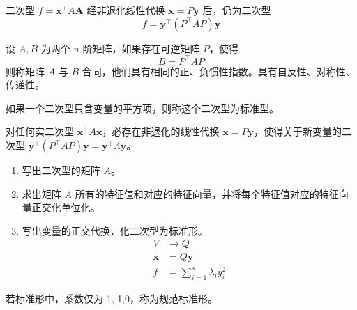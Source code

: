 \documentclass{ctexbook}
\begin{document}
\begin{theorem}[非退化线性代换后仍为二次型]
    二次型 $f=\boldsymbol{x}^\top A\boldsymbol{A}$ 经非退化线性代换 $\boldsymbol{x}=P\boldsymbol{y}$ 后，仍为二次型
    \begin{equation}
        f=\boldsymbol{y}^\top (P^\top AP)\boldsymbol{y}
    \end{equation}
\end{theorem}

\begin{definition}[合同]
    设 $A,B$ 为两个 $n$ 阶矩阵，如果存在可逆矩阵 $P$，使得
    \begin{equation}
        B=P^\top AP
    \end{equation}
    则称矩阵 $A$ 与 $B$ 合同，他们具有相同的正、负惯性指数。具有自反性、对称性、传递性。
\end{definition}

\begin{definition}[标准形]
    如果一个二次型只含变量的平方项，则称这个二次型为标准型。
\end{definition}

\begin{theorem}[转为标准形]
    对任何实二次型 $\boldsymbol{x}^\top A\boldsymbol{x}$，必存在非退化的线性代换 $\boldsymbol{x}=P\boldsymbol{y}$，使得关于新变量的二次型 $\boldsymbol{y}^\top (P^\top AP)\boldsymbol{y}=\boldsymbol{y}^\top\Lambda\boldsymbol{y}$。
\end{theorem}

\begin{proposition}[正交代换法]
    \begin{enumerate}
        \item 写出二次型的矩阵 $A$。
        \item 求出矩阵 $A$ 所有的特征值和对应的特征向量，并将每个特征值对应的特征向量正交化单位化。
        \item 写出变量的正交代换，化二次型为标准形。
        \begin{align}
            V&\rightarrow Q\\
            \boldsymbol{x}&=Q\boldsymbol{y}\\
            f&=\sum_{i=1}^s \lambda_iy_i^2
        \end{align}
    \end{enumerate}
\end{proposition}

\begin{definition}[规范标准形]
    若标准形中，系数仅为 1,-1,0，称为规范标准形。
\end{definition}
\end{document}
